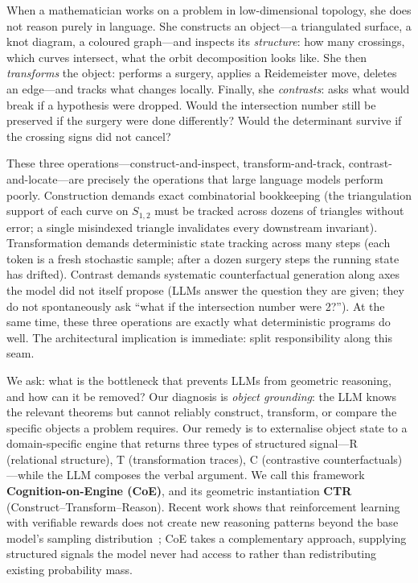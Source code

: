 \documentclass{article}
\begin{document}
When a mathematician works on a problem in low-dimensional topology, she does not
reason purely in language. She constructs an object---a triangulated surface, a knot
diagram, a coloured graph---and inspects its \emph{structure}: how many crossings,
which curves intersect, what the orbit decomposition looks like. She then
\emph{transforms} the object: performs a surgery, applies a Reidemeister move, deletes
an edge---and tracks what changes locally. Finally, she \emph{contrasts}: asks what
would break if a hypothesis were dropped. Would the intersection number still be
preserved if the surgery were done differently? Would the determinant survive if the
crossing signs did not cancel?

These three operations---construct-and-inspect, transform-and-track,
contrast-and-locate---are precisely the operations that large language models perform
poorly. Construction demands exact combinatorial bookkeeping (the triangulation
support of each curve on $S_{1,2}$ must be tracked across dozens of triangles
without error; a single misindexed triangle invalidates every downstream invariant).
Transformation demands deterministic state
tracking across many steps (each token is a fresh stochastic sample; after a dozen
surgery steps the running state has drifted). Contrast demands systematic
counterfactual generation along axes the model did not itself propose (LLMs answer the
question they are given; they do not spontaneously ask ``what if the intersection
number were 2?''). At the same time, these three operations are exactly what
deterministic programs do well. The architectural implication is immediate: split
responsibility along this seam.

We ask: what is the bottleneck that prevents LLMs from geometric reasoning, and how
can it be removed? Our diagnosis is \emph{object grounding}: the LLM knows the
relevant theorems but cannot reliably construct, transform, or compare the specific
objects a problem requires. Our remedy is to externalise object state to a
domain-specific engine that returns three types of structured signal---R (relational
structure), T (transformation traces), C (contrastive counterfactuals)---while the
LLM composes the verbal argument. We call this framework
\textbf{Cognition-on-Engine (CoE)}, and its geometric instantiation \textbf{CTR}
(Construct--Transform--Reason). Recent work
shows that reinforcement learning with verifiable rewards does not create new reasoning
patterns beyond the base model's sampling distribution~\citep{yang2025rlvr}; CoE takes
a complementary approach, supplying structured signals the model never had access to
rather than redistributing existing probability mass.
\end{document}

